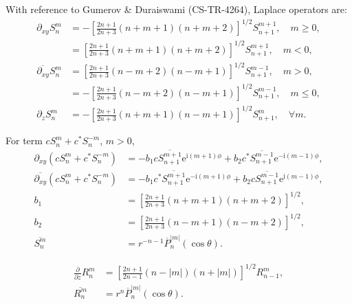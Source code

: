 \documentclass[a4paper,12pt]{article}
\newcommand{\E}{\mathrm{e}}
\newcommand{\J}{\mathrm{i}}
\begin{document}
With reference to Gumerov \& Duraiswami (CS-TR-4264), Laplace
operators are:
\begin{align}
  \partial_{xy} S_{n}^{m}
  &=
    -\left[
    \frac{2n+1}{2n+3}(n+m+1)(n+m+2)
    \right]^{1/2}
    S_{n+1}^{m+1},\quad m \geq 0,\\
  &=
    \left[
    \frac{2n+1}{2n+3}(n+m+1)(n+m+2)
    \right]^{1/2}
    S_{n+1}^{m+1},\quad m < 0,\\
  \overline{\partial_{xy}} S_{n}^{m}
  &=
    \left[
    \frac{2n+1}{2n+3}(n-m+2)(n-m+1)
    \right]^{1/2}
    S_{n+1}^{m-1},\quad m > 0,\\
  &=
    -\left[
    \frac{2n+1}{2n+3}(n-m+2)(n-m+1)
    \right]^{1/2}
    S_{n+1}^{m-1},\quad m \leq 0,\\
  \partial_{z}S_{n}^{m}
  &=
    -\left[
    \frac{2n+1}{2n+3}(n+m+1)(n-m+1)    
    \right]^{1/2}
    S_{n+1}^{m},\quad \forall m.
\end{align}

For term $cS_{n}^{m}+c^{*}S_{n}^{-m}$, $m>0$,
\begin{align}
  \partial_{xy} \left(cS_{n}^{m} + c^{*}S_{n}^{-m}\right)
  &=
    -b_{1}c
    \overline{S_{n+1}^{m+1}}\E^{\J(m+1)\phi}
    +b_{2}c^{*}
    \overline{S_{n+1}^{m-1}}\E^{-\J(m-1)\phi},\\
  \overline{\partial_{xy}} \left(cS_{n}^{m} + c^{*}S_{n}^{-m}\right)
  &=
    -b_{1}c^{*} \overline{S_{n+1}^{m+1}}\E^{-\J(m+1)\phi}
    +b_{2}c \overline{S_{n+1}^{m-1}}\E^{\J(m-1)\phi},\\
  b_{1} &=
          \left[
          \frac{2n+1}{2n+3}(n+m+1)(n+m+2)
          \right]^{1/2},\\
  b_{2} &=
          \left[
          \frac{2n+1}{2n+3}(n-m+1)(n-m+2)
          \right]^{1/2},\\
  \overline{S_{n}^{m}}
  &=
    r^{-n-1}\overline{P}_{n}^{|m|}(\cos\theta).
\end{align}

\begin{align}
  \frac{\partial}{\partial z}
  R_{n}^{m}
  &=
    \left[
    \frac{2n+1}{2n-1}(n-|m|)(n+|m|)
    \right]^{1/2}
    R_{n-1}^{m},\\
  \overline{R_{n}^{m}}
  &=
    r^{n}\overline{P}_{n}^{|m|}(\cos\theta).
\end{align}
\end{document}
